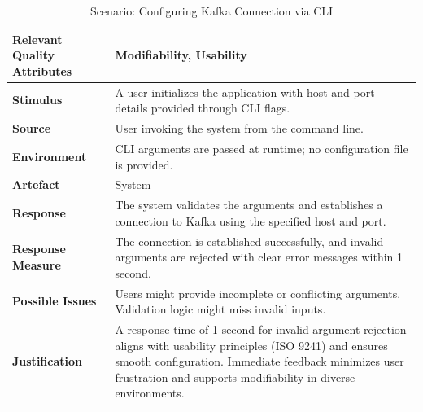 \documentclass[10pt , a4paper]{report}
\begin{document}
\begin{small}
\begin{table}[h!tbp]
\centering
\renewcommand{\arraystretch}{1.3} %
\begin{tabular}{|l|p{9cm}|}
\hline
\textbf{Relevant Quality Attributes} & Modifiability, Usability \\ \hline
\textbf{Stimulus} & A user initializes the application with host and port details provided through CLI flags. \\ \hline
\textbf{Source} & User invoking the system from the command line. \\ \hline
\textbf{Environment} & CLI arguments are passed at runtime; no configuration file is provided. \\ \hline
\textbf{Artefact} & System \\ \hline
\textbf{Response} & The system validates the arguments and establishes a connection to Kafka using the specified host and port. \\ \hline
\textbf{Response Measure} & The connection is established successfully, and invalid arguments are rejected with clear error messages within 1 second. \\ \hline
\textbf{Possible Issues} & Users might provide incomplete or conflicting arguments. Validation logic might miss invalid inputs. \\ \hline
\textbf{Justification} & A response time of 1 second for invalid argument rejection aligns with usability principles (ISO 9241) and ensures smooth configuration. Immediate feedback minimizes user frustration and supports modifiability in diverse environments. \\ \hline
\end{tabular}
\caption{Scenario: Configuring Kafka Connection via CLI}
\end{table}


\end{small}
\end{document}
